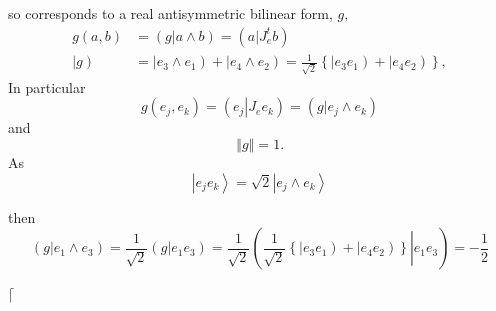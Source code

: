 \documentclass[aps,preprint]{revtex4}%
\begin{document}
so corresponds to a real antisymmetric bilinear form, $g,$%
\begin{align}
g\left(  a,b\right)   &  =\left(  \left.  g\right\vert a\wedge b\right)
=\left(  \left.  a\right\vert J_{e}^{t}b\right)  \\
\left\vert g\right)   &  =\left\vert e_{3}\wedge e_{1}\right)  +\left\vert
e_{4}\wedge e_{2}\right)  =\frac{1}{\sqrt{2}}\left\{  \left\vert e_{3}%
e_{1}\right)  +\left\vert e_{4}e_{2}\right)  \right\}  ,
\end{align}
In particular
\begin{equation}
g\left(  e_{j},e_{k}\right)  =\left(  \left.  e_{j}\right\vert J_{e}%
e_{k}\right)  =\left(  \left.  g\right\vert e_{j}\wedge e_{k}\right)
\end{equation}
and%
\begin{equation}
\left\Vert g\right\Vert =1.
\end{equation}
As%
\begin{equation}
\left\vert e_{j}e_{k}\right\rangle \overset{}{=}\sqrt{2}\left\vert e_{j}\wedge
e_{k}\right\rangle
\end{equation}


then%
\begin{equation}
\left(  \left.  g\right\vert e_{1}\wedge e_{3}\right)  =\frac{1}{\sqrt{2}%
}\left(  \left.  g\right\vert e_{1}e_{3}\right)  =\frac{1}{\sqrt{2}}\left(
\left.  \frac{1}{\sqrt{2}}\left\{  \left\vert e_{3}e_{1}\right)  +\left\vert
e_{4}e_{2}\right)  \right\}  \right\vert e_{1}e_{3}\right)  =-\frac{1}{2}%
\end{equation}


$\lceil$%
\end{document}
